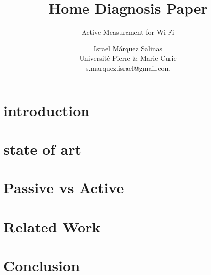 \documentclass[sigconf]{Template}
\begin{document}
\title{Home Diagnosis Paper}
\subtitle{Active Measurement for Wi-Fi}
\author{Israel M\'{a}rquez Salinas \\Universit\'{e} Pierre \& Marie Curie \\s.marquez.israel@gmail.com}
\maketitle

\begin{abstract}
	
\end{abstract}

\section{introduction}\label{Introduction}

\section{state of art}\label{State of Art}

\section{Passive vs Active}\label{Passive vs Active}

\section{Related Work}\label{Related Work}

\section{Conclusion}\label{Conclusion}



\end{document}
